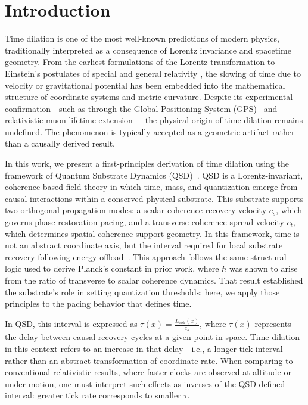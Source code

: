 \documentclass[entropy,article,submit,pdftex,moreauthors]{Definitions/mdpi}
\begin{document}



\section{Introduction}

Time dilation is one of the most well-known predictions of modern physics, traditionally interpreted as a consequence of Lorentz invariance and spacetime geometry. From the earliest formulations of the Lorentz transformation to Einstein’s postulates of special\cite{einstein19o5} and general relativity \cite{einstein1915}, the slowing of time due to velocity or gravitational potential has been embedded into the mathematical structure of coordinate systems and metric curvature. Despite its experimental confirmation—such as through the Global Positioning System (GPS)~\cite{ashby-gps} and relativistic muon lifetime extension~\cite{bailey-muon}—the physical origin of time dilation remains undefined. The phenomenon is typically accepted as a geometric artifact rather than a causally derived result.

In this work, we present a first-principles derivation of time dilation using the framework of Quantum Substrate Dynamics (QSD)~\cite{bush2025}. QSD is a Lorentz-invariant, coherence-based field theory in which time, mass, and quantization emerge from causal interactions within a conserved physical substrate. This substrate supports two orthogonal propagation modes: a scalar coherence recovery velocity \( c_s \), which governs phase restoration pacing, and a transverse coherence spread velocity \( c_t \), which determines spatial coherence support geometry. In this framework, time is not an abstract coordinate axis, but the interval required for local substrate recovery following energy offload~\cite{bush-planck-2025}. This approach follows the same structural logic used to derive Planck’s constant in prior work, where \( \hbar \) was shown to arise from the ratio of transverse to scalar coherence dynamics. That result established the substrate’s role in setting quantization thresholds; here, we apply those principles to the pacing behavior that defines time.

In QSD, this interval is expressed as \( \tau(x) = \frac{L_{\text{coh}}(x)}{c_s} \), where \( \tau(x) \) represents the delay between causal recovery cycles at a given point in space. Time dilation in this context refers to an increase in that delay—i.e., a longer tick interval—rather than an abstract transformation of coordinate rate. When comparing to conventional relativistic results, where faster clocks are observed at altitude or under motion, one must interpret such effects as inverses of the QSD-defined interval: greater tick rate corresponds to smaller \( \tau \).
\end{document}
